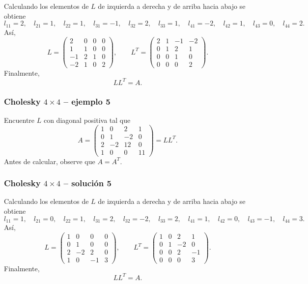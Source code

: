 Calculando los elementos de $L$ de izquierda a derecha y de arriba hacia abajo se obtiene
\[
l_{11}=2,\quad l_{21}=1,\quad l_{22}=1,\quad l_{31}=-1,\quad l_{32}=2,\quad l_{33}=1,\quad l_{41}=-2,\quad l_{42}=1,\quad l_{43}=0,\quad l_{44}=2.
\]
Así,
\[
L=\begin{pmatrix}2 & 0 & 0 & 0\\1 & 1 & 0 & 0\\-1 & 2 & 1 & 0\\-2 & 1 & 0 & 2\end{pmatrix},\qquad L^T=\begin{pmatrix}2 & 1 & -1 & -2\\0 & 1 & 2 & 1\\0 & 0 & 1 & 0\\0 & 0 & 0 & 2\end{pmatrix}.
\]
Finalmente,
\[
\boxed{LL^T=A}.
\]


\subsubsection*{Cholesky $4\times 4$ -- ejemplo 5}

Encuentre $L$ con diagonal positiva tal que
\[
A=\begin{pmatrix}1 & 0 & 2 & 1\\0 & 1 & -2 & 0\\2 & -2 & 12 & 0\\1 & 0 & 0 & 11\end{pmatrix}=LL^T.
\]
Antes de calcular, observe que $A=A^T$.


\subsubsection*{Cholesky $4\times 4$ -- solución 5}

Calculando los elementos de $L$ de izquierda a derecha y de arriba hacia abajo se obtiene
\[
l_{11}=1,\quad l_{21}=0,\quad l_{22}=1,\quad l_{31}=2,\quad l_{32}=-2,\quad l_{33}=2,\quad l_{41}=1,\quad l_{42}=0,\quad l_{43}=-1,\quad l_{44}=3.
\]
Así,
\[
L=\begin{pmatrix}1 & 0 & 0 & 0\\0 & 1 & 0 & 0\\2 & -2 & 2 & 0\\1 & 0 & -1 & 3\end{pmatrix},\qquad L^T=\begin{pmatrix}1 & 0 & 2 & 1\\0 & 1 & -2 & 0\\0 & 0 & 2 & -1\\0 & 0 & 0 & 3\end{pmatrix}.
\]
Finalmente,
\[
\boxed{LL^T=A}.
\]

